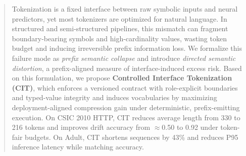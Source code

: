 \begin{abstract}
Tokenization is a fixed interface between raw symbolic inputs and neural predictors, yet most tokenizers are optimized for natural language.
In structured and semi-structured pipelines, this mismatch can fragment boundary-bearing symbols and high-cardinality values, wasting token budget and inducing irreversible prefix information loss.
We formalize this failure mode as \emph{prefix semantic collapse} and introduce \emph{directed semantic distortion}, a prefix-aligned measure of interface-induced excess risk.
Based on this formulation, we propose \textbf{Controlled Interface Tokenization (CIT)}, which enforces a versioned contract with role-explicit boundaries and typed-value integrity and induces vocabularies by maximizing deployment-aligned compression gain under deterministic, prefix-emitting execution.
On CSIC 2010 HTTP, CIT reduces average length from 330 to 216 tokens and improves drift accuracy from $\approx$0.50 to 0.92 under token-fair budgets.
On Adult, CIT shortens sequences by 43\% and reduces P95 inference latency while matching accuracy.
\end{abstract}

